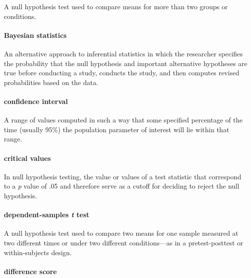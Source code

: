\documentclass[
]{krantz}
\begin{document}
A null hypothesis test used to compare means for more than two groups or conditions.

\paragraph*{Bayesian statistics}\label{bayesian-statistics}

An alternative approach to inferential statistics in which the researcher specifies the probability that the null hypothesis and important alternative hypotheses are true before conducting a study, conducts the study, and then computes revised probabilities based on the data.

\paragraph*{confidence interval}\label{confidence-interval}

A range of values computed in such a way that some specified percentage of the time (usually 95\%) the population parameter of interest will lie within that range.

\paragraph*{critical values}\label{critical-values}

In null hypothesis testing, the value or values of a test statistic that correspond to a \emph{p} value of .05 and therefore serve as a cutoff for deciding to reject the null hypothesis.

\paragraph*{\texorpdfstring{dependent-samples \emph{t} test}{dependent-samples t test}}\label{dependent-samples-t-test}

A null hypothesis test used to compare two means for one sample measured at two different times or under two different conditions---as in a pretest-posttest or within-subjects design.

\paragraph*{difference score}\label{difference-score}
\end{document}
